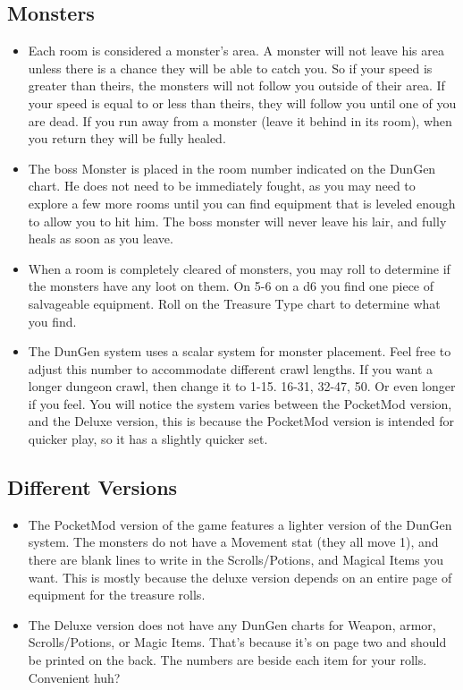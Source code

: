 \documentclass[a6paper,hidelinks]{article}
\begin{document}
\subsection{Monsters}

\begin{itemize}

\item Each room is considered a monster’s area. A monster will not leave his area unless there is a chance they will be able to catch you. So if your speed is greater than theirs, the monsters will not follow you outside of their area. If your speed is equal to or less than theirs, they will follow you until one of you are dead. If you run away from a monster (leave it behind in its room), when you return they will be fully healed.

\item The boss Monster is placed in the room number indicated on the DunGen chart. He does not need to be immediately fought, as you may need to explore a few more rooms until you can find equipment that is leveled enough to allow you to hit him. The boss monster will never leave his lair, and fully heals as soon as you leave.

\item When a room is completely cleared of monsters, you may roll to determine if the monsters have any loot on them. On 5-6 on a d6 you find one piece of salvageable equipment. Roll on the Treasure Type chart to determine what you find.

\item The DunGen system uses a scalar system for monster placement. Feel free to adjust this number to accommodate different crawl lengths. If you want a
longer dungeon crawl, then change it to 1-15. 16-31, 32-47, 50. Or even longer if you feel. You will notice the system varies between the PocketMod
version, and the Deluxe version, this is because the PocketMod version is intended for quicker play, so it has a slightly quicker set.

\end{itemize}

\subsection{Different Versions}

\begin{itemize}

\item The PocketMod version of the game features a lighter version of the DunGen system. The monsters do not have a Movement stat (they all move 1), and
there are blank lines to write in the Scrolls/Potions, and Magical Items you want. This is mostly because the deluxe version depends on an entire page of equipment for the treasure rolls.

\item The Deluxe version does not have any DunGen charts for Weapon, armor, Scrolls/Potions, or Magic Items. That’s because it’s on page two and should be printed on the back. The numbers are beside each item for your rolls. Convenient huh?

\end{itemize}
\end{document}
